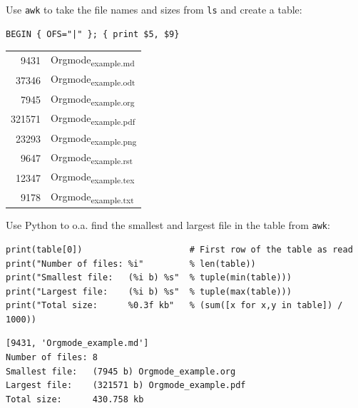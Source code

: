 \documentclass[11pt]{article}
\begin{document}
\begin{enumerate}
Use \texttt{awk} to take the file names and sizes from \texttt{ls} and create a table:
\begin{verbatim}
BEGIN { OFS="|" }; { print $5, $9}
\end{verbatim}

\begin{center}
\begin{tabular}{rl}
9431 & Orgmode\textsubscript{example.md}\\
37346 & Orgmode\textsubscript{example.odt}\\
7945 & Orgmode\textsubscript{example.org}\\
321571 & Orgmode\textsubscript{example.pdf}\\
23293 & Orgmode\textsubscript{example.png}\\
9647 & Orgmode\textsubscript{example.rst}\\
12347 & Orgmode\textsubscript{example.tex}\\
9178 & Orgmode\textsubscript{example.txt}\\
\end{tabular}
\end{center}

Use Python to o.a. find the smallest and largest file in the table from \texttt{awk}:
\begin{verbatim}
print(table[0])                     # First row of the table as read
print("Number of files: %i"         % len(table))
print("Smallest file:   (%i b) %s"  % tuple(min(table)))
print("Largest file:    (%i b) %s"  % tuple(max(table)))
print("Total size:      %0.3f kb"   % (sum([x for x,y in table]) / 1000))
\end{verbatim}

\begin{verbatim}
[9431, 'Orgmode_example.md']
Number of files: 8
Smallest file:   (7945 b) Orgmode_example.org
Largest file:    (321571 b) Orgmode_example.pdf
Total size:      430.758 kb
\end{verbatim}
\end{enumerate}
\end{document}
